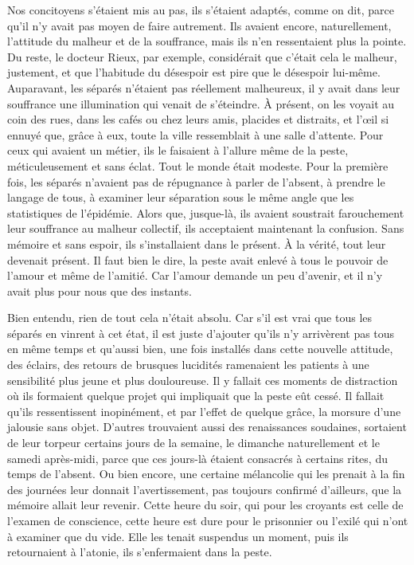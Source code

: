 \documentclass[french,twoside]{book} %
\begin{document}
Nos concitoyens s’étaient mis au pas, ils s’étaient adaptés, comme on dit, parce qu’il n’y avait pas moyen de faire autrement. Ils avaient encore, naturellement, l’attitude du malheur et de la souffrance, mais ils n’en ressentaient plus la pointe. Du reste, le docteur Rieux, par exemple, considérait que c’était cela le malheur, justement, et que l’habitude du désespoir est pire que le désespoir lui-même. Auparavant, les séparés n’étaient pas réellement malheureux, il y avait dans leur souffrance une illumination qui venait de s’éteindre. À présent, on les voyait au coin des rues, dans les cafés ou chez leurs amis, placides et distraits, et l’œil si ennuyé que, grâce à eux, toute la ville ressemblait à une salle d’attente. Pour ceux qui avaient un métier, ils le faisaient à l’allure même de la peste, méticuleusement et sans éclat. Tout le monde était modeste. Pour la première fois, les séparés n’avaient pas de répugnance à parler de l’absent, à prendre le langage de tous, à examiner leur séparation sous le même angle que les statistiques de l’épidémie. Alors que, jusque-là, ils avaient soustrait farouchement leur souffrance au malheur collectif, ils acceptaient maintenant la confusion. Sans mémoire et sans espoir, ils s’installaient dans le présent. À la vérité, tout leur devenait présent. Il faut bien le dire, la peste avait enlevé à tous le pouvoir de l’amour et même de l’amitié. Car l’amour demande un peu d’avenir, et il n’y avait plus pour nous que des instants.\par
Bien entendu, rien de tout cela n’était absolu. Car s’il est vrai que tous les séparés en vinrent à cet état, il est juste d’ajouter qu’ils n’y arrivèrent pas tous en même temps et qu’aussi bien, une fois installés dans cette nouvelle attitude, des éclairs, des retours de brusques lucidités ramenaient les patients à une sensibilité plus jeune et plus douloureuse. Il y fallait ces moments de distraction où ils formaient quelque projet qui impliquait que la peste eût cessé. Il fallait qu’ils ressentissent inopinément, et par l’effet de quelque grâce, la morsure d’une jalousie sans objet. D’autres trouvaient aussi des renaissances soudaines, sortaient de leur torpeur certains jours de la semaine, le dimanche naturellement et le samedi après-midi, parce que ces jours-là étaient consacrés à certains rites, du temps de l’absent. Ou bien encore, une certaine mélancolie qui les prenait à la fin des journées leur donnait l’avertissement, pas toujours confirmé d’ailleurs, que la mémoire allait leur revenir. Cette heure du soir, qui pour les croyants est celle de l’examen de conscience, cette heure est dure pour le prisonnier ou l’exilé qui n’ont à examiner que du vide. Elle les tenait suspendus un moment, puis ils retournaient à l’atonie, ils s’enfermaient dans la peste.\par
\end{document}
